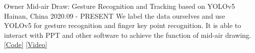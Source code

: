 \begin{cventries}



	\cventry
	{Owner} %
	{Mid-air Draw: Gesture Recognition and Tracking based on YOLOv5} %
	{Hainan, China} %
	{2020.09 - PRESENT} %
	{
		We label the data ourselves and use YOLOv5 for gesture recognition and finger key point recognition. It is able to interact with PPT and other software to achieve the function of mid-air drawing. \textcolor{awesome-red}{\href{https://github.com/beiyuouo/mid-air-draw}{[Code]}} \textcolor{awesome-red}{\href{https://www.bilibili.com/video/BV15V411a7WB/}{[Video]}}
	}

	
\end{cventries}

